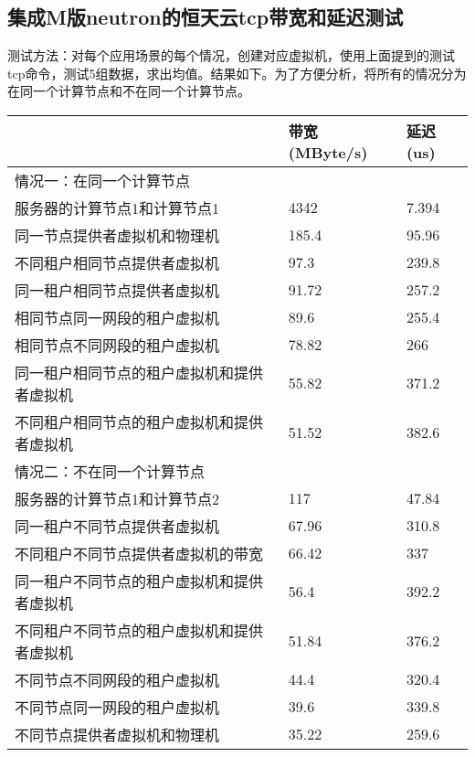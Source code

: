 \documentclass[a4paper,left=1.5cm,right=1.5cm,11pt]{article}
\begin{document}
\subsection{集成M版neutron的恒天云tcp带宽和延迟测试}
测试方法：对每个应用场景的每个情况，创建对应虚拟机，使用上面提到的测试tcp命令，测试5组数据，求出均值。结果如下。为了方便分析，将所有的情况分为在同一个计算节点和不在同一个计算节点。
\begin{center}
\begin{tabular}[c]{|l|l|l|}
\hline
 &  带宽(MByte/s)&延迟(us) \\
\hline
 情况一：在同一个计算节点 &  &\\
\hline
服务器的计算节点1和计算节点1 & 4342&7.394 \\
\hline
 同一节点提供者虚拟机和物理机& 185.4&95.96 \\
 \hline
 不同租户相同节点提供者虚拟机& 97.3&239.8 \\
\hline
 同一租户相同节点提供者虚拟机 & 91.72&257.2 \\
 \hline
 相同节点同一网段的租户虚拟机& 89.6&255.4 \\
 \hline
 相同节点不同网段的租户虚拟机&  78.82&266\\
 \hline
 同一租户相同节点的租户虚拟机和提供者虚拟机& 55.82&371.2 \\
 \hline
 不同租户相同节点的租户虚拟机和提供者虚拟机& 51.52&382.6 \\
 \hline
 \hline

 情况二：不在同一个计算节点&  &\\
 \hline
 服务器的计算节点1和计算节点2& 117&47.84 \\
 \hline
 同一租户不同节点提供者虚拟机 & 67.96&310.8 \\
 \hline
 不同租户不同节点提供者虚拟机的带宽& 66.42&337 \\
 \hline
 同一租户不同节点的租户虚拟机和提供者虚拟机& 56.4&392.2 \\
 \hline
 不同租户不同节点的租户虚拟机和提供者虚拟机& 51.84&376.2 \\
 \hline
 不同节点不同网段的租户虚拟机&  44.4&320.4\\
 \hline
 不同节点同一网段的租户虚拟机&  39.6&339.8\\
 \hline
 不同节点提供者虚拟机和物理机& 35.22&259.6 \\
\hline
\end{tabular}
\end{center}
\end{document}
